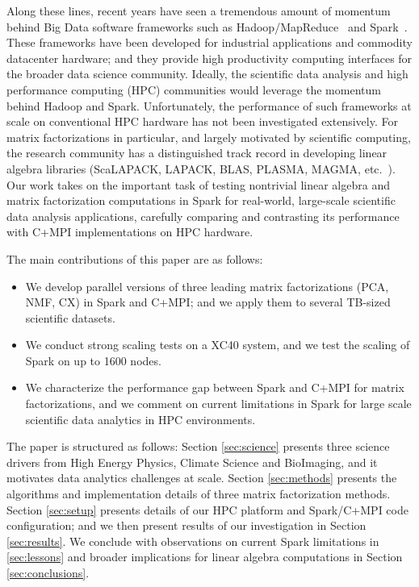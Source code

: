 Along these lines, recent years have seen a tremendous amount of momentum behind Big Data software frameworks such as Hadoop/MapReduce~\cite{DG04} and Spark~\cite{SPARK_HOTC_10}. 
These frameworks have been developed for industrial applications and commodity datacenter hardware; and they provide high productivity computing interfaces for the broader data science community.  
Ideally, the scientific data analysis and high performance computing (HPC) communities would leverage the momentum behind Hadoop and Spark.
Unfortunately, the performance of such frameworks at scale on conventional HPC hardware has not been investigated extensively. 
For matrix factorizations in particular, and largely motivated by scientific computing, the research community has a distinguished track record in developing linear algebra libraries (ScaLAPACK, LAPACK, BLAS, PLASMA, MAGMA, etc.~\cite{lapack99,PlasmaMagma2009}). 
Our work takes on the important task of testing nontrivial linear algebra and matrix factorization computations in Spark for real-world, large-scale scientific data analysis applications, carefully comparing and contrasting its performance with C+MPI implementations on HPC hardware. 

The main contributions of this paper are as follows:
\begin{itemize}
\item{We develop parallel versions of three leading matrix factorizations (PCA, NMF, CX) in Spark and C+MPI; and we apply them to several TB-sized scientific datasets.}
\item{We conduct strong scaling tests on a XC40 system, and we test the scaling of Spark on up to 1600 nodes.}
\item{We characterize the performance gap between Spark and C+MPI for matrix factorizations, and we comment on current limitations in Spark for large scale scientific data analytics in HPC environments.}
\end{itemize}

The paper is structured as follows: Section \ref{sec:science} presents three science drivers from High Energy Physics, Climate Science and BioImaging, and it motivates data analytics challenges at scale. Section \ref{sec:methods} presents the algorithms and implementation details of three matrix factorization methods. Section \ref{sec:setup} presents details of our HPC platform and Spark/C+MPI code configuration; and we then present results of our investigation in Section \ref{sec:results}. We conclude with observations on current Spark limitations in \ref{sec:lessons} and broader implications for linear algebra computations in Section \ref{sec:conclusions}. 